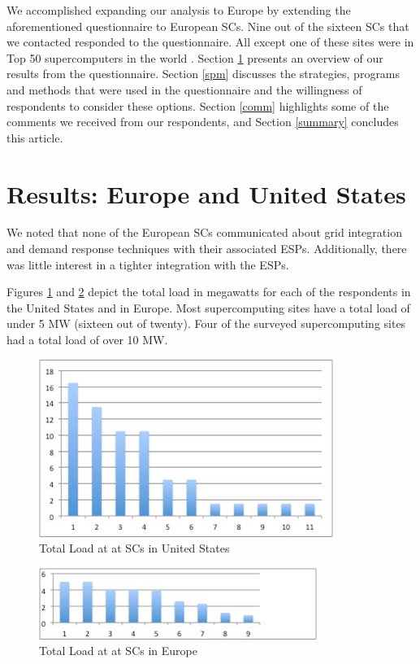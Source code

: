 \documentclass{article}
\begin{document}
We accomplished expanding our analysis to Europe by extending the aforementioned questionnaire to European SCs. Nine out of the sixteen SCs that we contacted responded to the questionnaire. All except one of these sites were in Top 50 supercomputers in the world \cite{Top500}. Section \ref{res} presents an overview of our results from the questionnaire. Section \ref{spm} discusses the strategies, programs and methods that were used in the questionnaire and the willingness of respondents to consider these options. Section \ref{comm} highlights some of the comments we received from our respondents, and Section \ref{summary} concludes this article.

\section{Results: Europe and United States}
\label{res}
We noted that none of the European SCs communicated about grid integration and demand response techniques with their associated ESPs. Additionally, there was little interest in a tighter integration with the ESPs.

Figures \ref{fig:USload} and \ref{fig:EUload} depict the total load in megawatts for each of the respondents in the United States and in Europe. Most supercomputing sites have a total load of under 5 MW (sixteen out of twenty). Four of the surveyed supercomputing sites had a total load of over 10 MW. 
\begin{figure}
\begin{center}
\includegraphics[scale=0.7]{figs/USLoad.jpg}
\caption{Total Load at at SCs in United States}
\label{fig:USload}
\end{center}
\end{figure}

\begin{figure}
\begin{center}
\includegraphics[scale=1]{figs/EULoad.jpg}
\caption{Total Load at at SCs in Europe}
\label{fig:EUload}
\end{center}
\end{figure}
\end{document}
